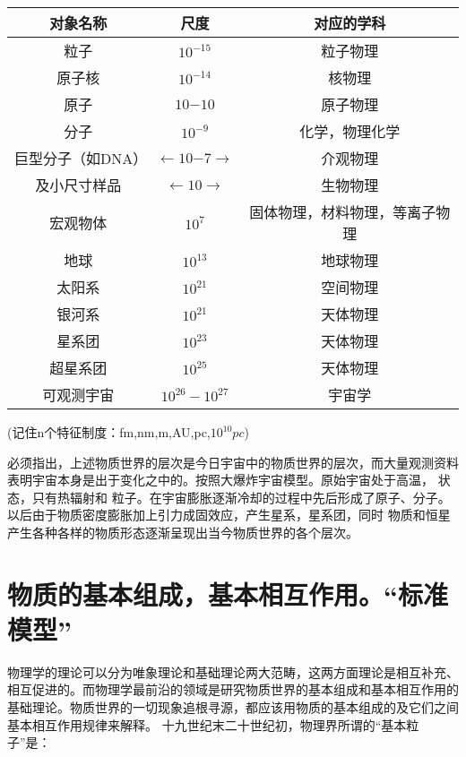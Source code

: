 \begin{center}
\begin{tabular}{|c|c|c|}\hline  
          对象名称 &  尺度        & 对应的学科 \\ \hline
          粒子     &  $10^{-15}$   & 粒子物理   \\ \hline
          原子核   &  $10^{-14}$   &核物理\\ \hline
          原子     &  $10{-10}$  &原子物理\\ \hline
          分子     &$10^{-9}$    &化学，物理化学\\ \hline
          巨型分子（如DNA）& $\longleftarrow10{-7}\longrightarrow$&介观物理\\ \hline
          及小尺寸样品&$\longleftarrow10\longrightarrow$&生物物理\\ \hline
          宏观物体&$10^7$&固体物理，材料物理，等离子物理\\ \hline
          地球&$10^{13}$&地球物理\\ \hline
          太阳系&$10^{21}$&空间物理\\ \hline
          银河系&$10^{21}$&天体物理\\ \hline
          星系团&$10^{23}$&天体物理\\ \hline
          超星系团&$10^{25}$&天体物理\\ \hline
          可观测宇宙&$10^{26}-10^{27}$&宇宙学\\ \hline
\end{tabular}
\end{center}

(记住n个特征制度：fm,nm,m,AU,pc,$10^{10}pc$)

必须指出，上述物质世界的层次是今日宇宙中的物质世界的层次，而大量观测资料表明宇宙本身是出于变化之中的。按照大爆炸宇宙模型。原始宇宙处于高温，   状态，只有热辐射和     粒子。在宇宙膨胀逐渐冷却的过程中先后形成了原子、分子。以后由于物质密度膨胀加上引力成固效应，产生星系，星系团，同时   物质和恒星产生各种各样的物质形态逐渐呈现出当今物质世界的各个层次。
\section{物质的基本组成，基本相互作用。“标准模型”}  
物理学的理论可以分为唯象理论和基础理论两大范畴，这两方面理论是相互补充、相互促进的。而物理学最前沿的领域是研究物质世界的基本组成和基本相互作用的基础理论。物质世界的一切现象追根寻源，都应该用物质的基本组成的及它们之间基本相互作用规律来解释。  
十九世纪末二十世纪初，物理界所谓的“基本粒子”是：

